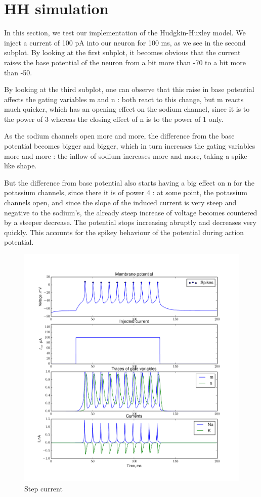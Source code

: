 \documentclass[a4paper,11pt]{article} %
\begin{document}
\section{HH simulation}

In this section, we test our implementation of the Hudgkin-Huxley model.
We inject a current of 100 pA into our neuron for 100 ms, as we see in
the second subplot. By looking at the first subplot, it becomes obvious
that the current raises the base potential of the neuron from a bit
more than -70 to a bit more than -50.

By looking at the third subplot, one can observe that this raise in
base potential affects the gating variables m and n : both react to
this change, but m reacts much quicker, which has an opening effect
on the sodium channel, since it is to the power of 3 whereas the closing
effect of n is to the power of 1 only.

As the sodium channels open more and more, the difference from the
base potential becomes bigger and bigger, which in turn increases the
gating variables more and more : the inflow of sodium increases more
and more, taking a spike-like shape.

But the difference from base potential also starts having a big effect
on n for the potassium channels, since there it is of power 4 : at
some point, the potassium channels open, and since the slope of the
induced current is very steep and negative to the sodium's, the already
steep increase of voltage becomes countered by a steeper decrease.
The potential stops increasing abruptly and decreases very quickly.
This accounts for the spikey behaviour of the potential during action
potential.

\begin{figure}[H]
    \centering
    \includegraphics[width=\textwidth]{step_cur}
    \caption{Step current}
    \label{fig:step}
\end{figure}
\end{document}
